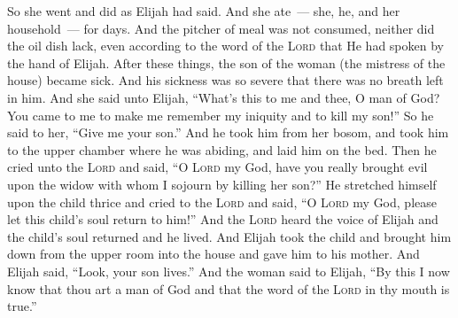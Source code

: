 \begin{inparaenum}
     So she went and did as Elijah had said. And she ate~--- she, he, and her household~--- for days.%
     And the pitcher of meal was not consumed, neither did the oil dish lack, even according to the word of the \textsc{Lord} that He had spoken by the hand of Elijah.%
     After these things, the son of the woman (the mistress of the house) became sick. And his sickness was so severe that there was no breath left in him.%
     And she said unto Elijah, ``What's this to me and thee, O man of God? You came to me to make me remember my iniquity and to kill my son!''%
     So he said to her, ``Give me your son.'' And he took him from her bosom, and took him to the upper chamber where he was abiding, and laid him on the bed.%
     Then he cried unto the \textsc{Lord} and said, ``O \textsc{Lord} my God, have you really brought evil upon the widow with whom I sojourn by killing her son?''%
     He stretched himself upon the child thrice and cried to the \textsc{Lord} and said, ``O \textsc{Lord} my God, please let this child's soul return to him!''%
     And the \textsc{Lord} heard the voice of Elijah and the child's soul returned and he lived.%
     And Elijah took the child and brought him down from the upper room into the house and gave him to his mother. And Elijah said, ``Look, your son lives.''%
     And the woman said to Elijah, ``By this I now know that thou art a man of God and that the word of the \textsc{Lord} in thy mouth is true.''%
\end{inparaenum}
